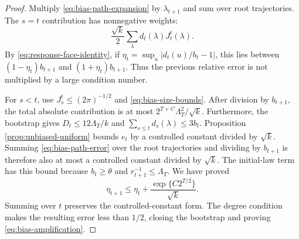\documentclass[11pt]{article}
\theoremstyle{remark}\newtheorem{remark}[theorem]{Remark}
\begin{document}
\begin{proof}
Multiply \eqref{eq:bias-path-expansion} by $\lambda_{t+1}$ and sum over
root trajectories. The $s=t$ contribution has nonnegative weights:
\[
 \frac{\sqrt k}{2}\sum_{\lambda}d_t(\lambda)J_t^t(\lambda).
\]
By \eqref{eq:response-face-identity}, if
$\eta_t=\sup_u|d_t(u)/b_t-1|$, this lies between
$(1-\eta_t)b_{t+1}$ and $(1+\eta_t)b_{t+1}$.
Thus the previous relative error is not multiplied by a large condition
number.

For $s<t$, use $J_s^t\le(2\pi)^{-1/2}$ and
\eqref{eq:bias-size-bounds}. After division by $b_{t+1}$, the total
absolute contribution is at most
$2^{T+C}\Lambda_T^2/\sqrt k$.
Furthermore, the bootstrap gives $D_t\le12\Lambda_T/k$ and
$\sum_{s\le t}d_s(\lambda)\le3b_t$.
Proposition \ref{prop:unbiased-uniform} bounds $e_t$ by a controlled
constant divided by $\sqrt k$. Summing \eqref{eq:bias-path-error} over
the root trajectories and dividing by $b_{t+1}$ is therefore also at most
a controlled constant divided by $\sqrt k$. The initial-law term has this
bound because $b_t\ge\theta$ and $r_{t+1}^{-1}\le\Lambda_T$.
We have proved
\[
 \eta_{t+1}\le\eta_t+
       \frac{\exp\{C2^{T/2}\}}{\sqrt k}.
\]
Summing over $t$ preserves the controlled-constant form. The degree
condition makes the resulting error less than $1/2$, closing the
bootstrap and proving \eqref{eq:bias-amplification}.
\end{proof}
\end{document}
